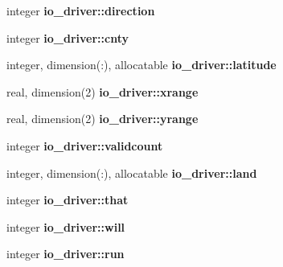 \begin{DoxyCompactItemize}
\item 
\hypertarget{namespaceio__driver_a124297f2858b86f218e1e5c59d300c68}{}integer {\bfseries io\+\_\+driver\+::direction}\label{namespaceio__driver_a124297f2858b86f218e1e5c59d300c68}

\item 
\hypertarget{namespaceio__driver_a07842be8b8749e3f0fa9e085d7daf0ca}{}integer {\bfseries io\+\_\+driver\+::cnty}\label{namespaceio__driver_a07842be8b8749e3f0fa9e085d7daf0ca}

\item 
\hypertarget{namespaceio__driver_af5f13a3da369445842e0850d6a4d33bf}{}integer, dimension(\+:), allocatable {\bfseries io\+\_\+driver\+::latitude}\label{namespaceio__driver_af5f13a3da369445842e0850d6a4d33bf}

\item 
\hypertarget{namespaceio__driver_ad43824dcc2ac43047423edd81531afa9}{}real, dimension(2) {\bfseries io\+\_\+driver\+::xrange}\label{namespaceio__driver_ad43824dcc2ac43047423edd81531afa9}

\item 
\hypertarget{namespaceio__driver_aea18f5bf684bab14b9f681f337abbc13}{}real, dimension(2) {\bfseries io\+\_\+driver\+::yrange}\label{namespaceio__driver_aea18f5bf684bab14b9f681f337abbc13}

\item 
\hypertarget{namespaceio__driver_a543f680dc96216a388458ceac9c5e4ba}{}integer {\bfseries io\+\_\+driver\+::validcount}\label{namespaceio__driver_a543f680dc96216a388458ceac9c5e4ba}

\item 
\hypertarget{namespaceio__driver_a6100fa06a4a3e9e9ac6fc58446cad6e4}{}integer, dimension(\+:), allocatable {\bfseries io\+\_\+driver\+::land}\label{namespaceio__driver_a6100fa06a4a3e9e9ac6fc58446cad6e4}

\item 
\hypertarget{namespaceio__driver_a11e41df50e08f8dee70e71d8c9ebf866}{}integer {\bfseries io\+\_\+driver\+::that}\label{namespaceio__driver_a11e41df50e08f8dee70e71d8c9ebf866}

\item 
\hypertarget{namespaceio__driver_acce5fac21a4f67d050c8e7bc60eb7004}{}integer {\bfseries io\+\_\+driver\+::will}\label{namespaceio__driver_acce5fac21a4f67d050c8e7bc60eb7004}

\item 
\hypertarget{namespaceio__driver_a682678764fa19208b5d21137385b0401}{}integer {\bfseries io\+\_\+driver\+::run}\label{namespaceio__driver_a682678764fa19208b5d21137385b0401}


\end{DoxyCompactItemize}
